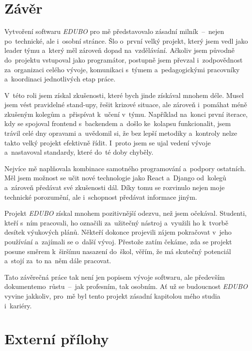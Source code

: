 \documentclass[male,czech,api_bc]{kitheses}
\begin{document}
\chapter{Závěr}

Vytvoření softwaru \textit{EDUBO} pro mě představovalo zásadní milník~--~nejen po~technické, ale i~osobní stránce. Šlo o~první velký projekt, který jsem vedl jako leader týmu a~který měl zároveň dopad na~vzdělávání. Ačkoliv jsem původně do~projektu vstupoval jako programátor, postupně jsem převzal i~zodpovědnost za~organizaci celého vývoje, komunikaci s~týmem a~pedagogickými pracovníky a~koordinaci jednotlivých etap práce.

V~této roli jsem získal zkušenosti, které bych jinde získával mnohem déle. Musel jsem vést pravidelné stand-upy, řešit krizové situace, ale zároveň i~pomáhat méně zkušeným kolegům a~přispívat k~učení v~týmu. Například na~konci první iterace, kdy se spojoval frontend s~backendem a~došlo ke~kolapsu funkcionalit, jsem trávil celé dny opravami a~uvědomil si, že bez lepší metodiky a~kontroly nelze takto velký projekt efektivně řídit. I~proto jsem se ujal vedení vývoje a~nastavoval standardy, které do~té doby chyběly.

Nejvíce mě naplňovala kombinace samotného programování a~podpory ostatních. Měl jsem možnost se učit nové technologie jako React a~Django od~kolegů a~zároveň předávat své zkušenosti dál. Díky tomu se rozvinulo nejen moje technické porozumění, ale i~schopnost předávat informace jiným.

Projekt \textit{EDUBO} získal mnohem pozitivnější odezvu, než jsem očekával. Studenti, kteří s~ním pracovali, ho označili za~užitečný nástroj a~využili ho k~tvorbě desítek výukových plánů. Někteří dokonce projevili zájem pokračovat v~jeho používání a~zajímali se o~další vývoj. Přestože zatím čekáme, zda se projekt posune směrem k~širšímu nasazení do~škol, věřím, že má skutečný potenciál a~stojí za~to na~něm dále pracovat.

Tato závěrečná práce tak není jen popisem vývoje softwaru, ale především dokumentem\break o~růstu~--~jak profesním, tak osobním. Ať už se budoucnost \textit{EDUBO} vyvine jakkoliv, pro~mě byl tento projekt zásadní kapitolou mého studia i~kariéry.


\sloppy
\printbibliography[title=Seznam použitých zdrojů]

\chapter{Externí přílohy}
\end{document}
